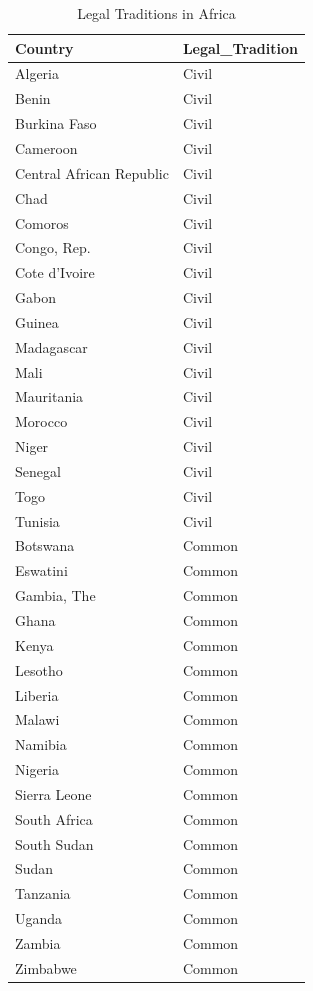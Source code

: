 \documentclass[a4paper, nobind]{templates/ociamthesis}
\begin{document}
\begin{table}

\caption{\label{tab:unnamed-chunk-57}Legal Traditions in Africa}
\centering
\fontsize{7}{9}\selectfont
\begin{tabular}[t]{ll}
\toprule
Country & Legal\_Tradition\\
\midrule
Algeria & Civil\\
Benin & Civil\\
Burkina Faso & Civil\\
Cameroon & Civil\\
Central African Republic & Civil\\
\addlinespace
Chad & Civil\\
Comoros & Civil\\
Congo, Rep. & Civil\\
Cote d'Ivoire & Civil\\
Gabon & Civil\\
\addlinespace
Guinea & Civil\\
Madagascar & Civil\\
Mali & Civil\\
Mauritania & Civil\\
Morocco & Civil\\
\addlinespace
Niger & Civil\\
Senegal & Civil\\
Togo & Civil\\
Tunisia & Civil\\
Botswana & Common\\
\addlinespace
Eswatini & Common\\
Gambia, The & Common\\
Ghana & Common\\
Kenya & Common\\
Lesotho & Common\\
\addlinespace
Liberia & Common\\
Malawi & Common\\
Namibia & Common\\
Nigeria & Common\\
Sierra Leone & Common\\
\addlinespace
South Africa & Common\\
South Sudan & Common\\
Sudan & Common\\
Tanzania & Common\\
Uganda & Common\\
\addlinespace
Zambia & Common\\
Zimbabwe & Common\\

\end{tabular}
\end{table}
\end{document}
